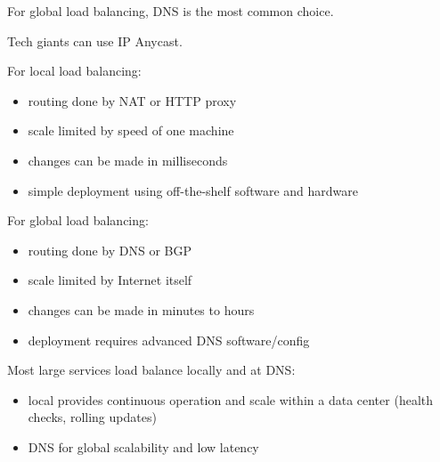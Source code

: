 \documentclass[11pt]{article}
\begin{document}
For global load balancing, DNS is the most common choice.

Tech giants can use IP Anycast.

For local load balancing:
\begin{itemize}
\item routing done by NAT or HTTP proxy
\item scale limited by speed of one machine
\item changes can be made in milliseconds
\item simple deployment using off-the-shelf software and hardware
\end{itemize}

For global load balancing:
\begin{itemize}
\item routing done by DNS or BGP
\item scale limited by Internet itself
\item changes can be made in minutes to hours
\item deployment requires advanced DNS software/config
\end{itemize}

Most large services load balance locally and at DNS:
\begin{itemize}
\item local provides continuous operation and scale within a data center (health checks, rolling updates)
\item DNS for global scalability and low latency
\end{itemize}
\end{document}
